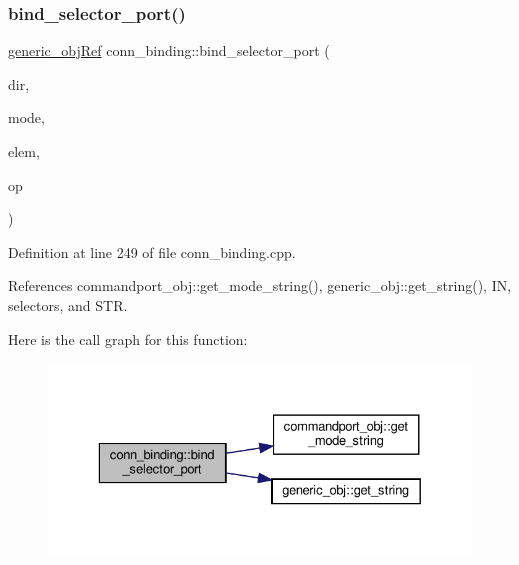 \subsubsection{\texorpdfstring{bind\+\_\+selector\+\_\+port()}{bind\_selector\_port()}\hspace{0.1cm}{\footnotesize\ttfamily [2/2]}}
{\footnotesize\ttfamily \hyperlink{generic__obj_8hpp_acb533b2ef8e0fe72e09a04d20904ca81}{generic\+\_\+obj\+Ref} conn\+\_\+binding\+::bind\+\_\+selector\+\_\+port (\begin{DoxyParamCaption}\item[{\hyperlink{classconn__binding_af1575e7a7dc7acd00fc5c947f413c663}{conn\+\_\+binding\+::direction\+\_\+type}}]{dir,  }\item[{unsigned int}]{mode,  }\item[{const \hyperlink{generic__obj_8hpp_acb533b2ef8e0fe72e09a04d20904ca81}{generic\+\_\+obj\+Ref}}]{elem,  }\item[{unsigned int}]{op }\end{DoxyParamCaption})}



Definition at line 249 of file conn\+\_\+binding.\+cpp.



References commandport\+\_\+obj\+::get\+\_\+mode\+\_\+string(), generic\+\_\+obj\+::get\+\_\+string(), IN, selectors, and S\+TR.

Here is the call graph for this function\+:
\nopagebreak
\begin{figure}[H]
\begin{center}
\leavevmode
\includegraphics[width=329pt]{d2/db1/classconn__binding_a723f7511cfb4dd34de9be43801fea518_cgraph}
\end{center}
\end{figure}
\mbox{\label{classconn__binding_af11f0bf92436cc8c5b6eb7002544f3dc}} 
